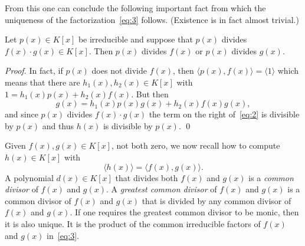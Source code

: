 From this one can conclude the following important fact from which the uniqueness of the factorization~\eqref{eq:3} follows. (Existence is in fact almost trivial.)
\begin{theorem}
  \label{thr:9}
  Let $p(x) ∈K[x]$ be irreducible and suppose that $p(x)$ divides $f(x) ⋅ g(x) ∈ K[x]$. Then $p(x)$ divides $f(x)$ or $p(x)$ divides $g(x)$. 
\end{theorem}
{\small \noindent 
\begin{proof}
  In fact, if $p(x)$ does not divide $f(x)$, then $〈p(x),f(x)〉 = 〈1〉$ which means that there are $h_1(x), h_2(x) ∈ K[x]$ with $1 = h_1(x) p(x) + h_2(x) f(x)$. But then
  \begin{equation}
    \label{eq:2}
    g(x) = h_1(x) p(x)  g(x)+ h_2(x) f(x) g(x),
  \end{equation}
  and since $p(x)$ divides $f(x) ⋅g(x)$ the term on the right of~\eqref{eq:2} is divisible by $p(x)$ and thus $h(x)$ is divisible by $p(x)$. \qed
  \end{proof}
  
}


Given $f(x),g(x) ∈K[x]$, not both zero, we now recall how to compute $h(x) ∈ K[x]$ with
\begin{displaymath}
  〈h(x) 〉 = 〈 f(x),g(x) 〉. 
\end{displaymath}
A polynomial $d(x) ∈K[x]$ that divides both $f(x)$ and $g(x)$ is a \emph{common divisor} of $f(x)$ and $g(x)$. A \emph{greatest common divisor} of $f(x)$ and $g(x)$ is a common divisor of $f(x)$ and $g(x)$ that is divided by any common divisor of $f(x)$ and $g(x)$.  If one requires the greatest common divisor to be monic, then it is also unique. It is the product of the common irreducible factors of $f(x)$ and $g(x)$ in~\eqref{eq:3}.


